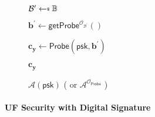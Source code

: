		
		





	

\begin{figure}[h]
\centering
	\begin{minipage}[t]{0.6\linewidth}
	\centering
	\begin{algorithm}[H]
	\caption{$\mathcal{A}(\textsf{psk})$ ( or $\mathcal{A}^{\mathcal{O}_\textsf{Probe}}$ ) }
	\label{alg:adv:FP}
	\begin{algorithmic}[1]
		\State $\mathcal{B}^\prime \getsdollar \mathbb{B}$
		
		\State $\mathbf{b}^\prime \gets \textsf{getProbe}^{\mathcal{O}_{\mathcal{B}^\prime }}()$

		\State $\mathbf{c_y} \gets \textsf{Probe}(\textsf{psk}, \mathbf{b}^\prime)$ 

		\State \Return $\mathbf{c_y}$
	\end{algorithmic}
	\end{algorithm}
	\end{minipage}
	
\end{figure}


\paragraph{UF Security with Digital Signature}

